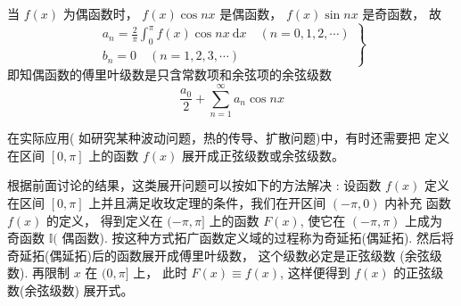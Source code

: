 \begin{definition}[余弦级数]
    当 $ f(x) $ 为偶函数时， $ f(x) \cos n x $ 是偶函数， $ f(x) \sin n x $ 是奇函数， 故
\begin{equation}
\left.\begin{array}{l}
a_{n}=\frac{2}{\pi} \int_{0}^{\pi} f(x) \cos n x \mathrm{~d} x \quad(n=0,1,2, \cdots) \\
b_{n}=0 \quad(n=1,2,3, \cdots)
\end{array}\right\}
\end{equation}
即知偶函数的傅里叶级数是只含常数项和余弦项的余弦级数
\begin{equation}
\frac{a_{0}}{2}+\sum_{n=1}^{\infty} a_{n} \cos n x
\end{equation}
\end{definition}

在实际应用( 如研究某种波动问题，热的传导、扩散问题)中，有时还需要把 定义在区间 $ [0, \pi] $ 上的函数 $ f(x) $ 展开成正弦级数或余弦级数。

根据前面讨论的结果，这类展开问题可以按如下的方法解决 : 设函数 $ f(x) $ 定义在区间 $ [0, \pi] $ 上并且满足收玫定理的条件，我们在开区间 $ (-\pi, 0) $ 内补充 函数 $ f(x) $ 的定义， 得到定义在 $ (-\pi, \pi] $ 上的函数 $ F(x) $, 使它在 $ (-\pi, \pi) $ 上成为 奇函数 $ \mathbb{I}( $ 偶函数). 按这种方式拓广函数定义域的过程称为奇延拓(偶延拓). 然后将奇延拓(偶延拓)后的函数展开成傅里叶级数， 这个级数必定是正弦级数 (余弦级数). 再限制 $ x $ 在 $ (0, \pi] $ 上， 此时 $ F(x) \equiv f(x) $, 这样便得到 $ f(x) $ 的正弦级 数(余弦级数) 展开式。


